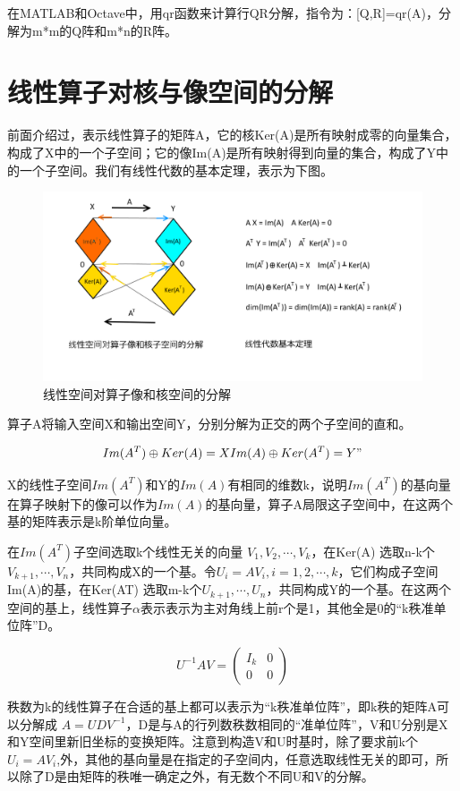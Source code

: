 在MATLAB和Octave中，用qr函数来计算行QR分解，指令为：[Q,R]=qr(A)，分解为m*m的Q阵和m*n的R阵。

\section{线性算子对核与像空间的分解}

前面介绍过，表示线性算子的矩阵A，它的核Ker(A)是所有映射成零的向量集合，构成了X中的一个子空间；它的像Im(A)是所有映射得到向量的集合，构成了Y中的一个子空间。我们有线性代数的基本定理，表示为下图。

\begin{figure}[h]
	\centering
	\includegraphics[width=0.7\linewidth]{pic/1604494yzy1do1yro41gva.png}
	\caption[代数学基本定理]{线性空间对算子像和核空间的分解}
	\label{fig:1604494yzy1do1yro41gva}
\end{figure}


算子A将输入空间X和输出空间Y，分别分解为正交的两个子空间的直和。

\[ Im(A^T)\oplus Ker(A)=X   Im(A)\oplus Ker(A^T)=Y"  \]%

X的线性子空间$ Im(A^T) $和Y的$ Im(A) $有相同的维数k，说明$ Im(A^T) $的基向量在算子映射下的像可以作为$ Im(A) $的基向量，算子A局限这子空间中，在这两个基的矩阵表示是k阶单位向量。

在$ Im(A^T) $子空间选取k个线性无关的向量 $ {V_1,V_2, \cdots,V_k} $，在Ker(A) 选取n-k个 $ {V_{k+1}, \cdots,V_n} $，共同构成X的一个基。令$ U_i= AV_i, i=1, 2, \cdots,k $，它们构成子空间Im(A)的基，在Ker(AT) 选取m-k个$  {U_{k+1}, \cdots,U_n} $，共同构成Y的一个基。在这两个空间的基上，线性算子$ \alpha $表示表示为主对角线上前r个是1，其他全是0的``k秩准单位阵''D。

\[U^{-1}AV = \begin{pmatrix}I_k&0\\0&0\end{pmatrix}\]

秩数为k的线性算子在合适的基上都可以表示为``k秩准单位阵''，即k秩的矩阵A可以分解成 $ A = UDV^{-1} $，D是与A的行列数秩数相同的``准单位阵''，V和U分别是X和Y空间里新旧坐标的变换矩阵。注意到构造V和U时基时，除了要求前k个$ U_i = AV_i $,外，其他的基向量是在指定的子空间内，任意选取线性无关的即可，所以除了D是由矩阵的秩唯一确定之外，有无数个不同U和V的分解。

